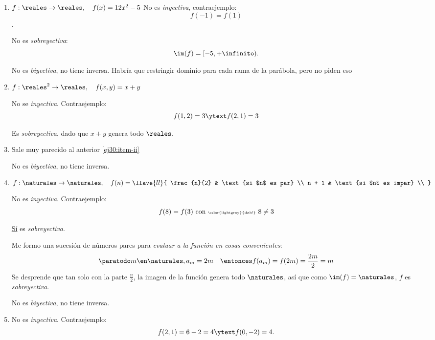 \begin{enumerate}[label=\roman*)]
  \item
        $f: \reales \to \reales,\quad f(x) = 12 x^2 - 5$
        No es \textit{inyectiva}, contraejemplo:
        $$
          f(-1) = f(1)
        $$.

        No es \textit{sobreyectiva}:
        $$
          \im(f) = [-5, +\infinito).
        $$

        No es \textit{biyectiva}, no tiene inversa. Habría que restringir dominio para cada rama de la parábola, pero no piden eso 

  \item\label{ej30:item-ii}
        $f: \reales^2 \to \reales,\quad f(x,y) = x + y$

        No se \textit{inyectiva}. Contraejemplo:
        $$
          f(1,2) = 3 \ytext f(2,1) = 3
        $$

        Es \textit{sobreyectiva}, dado que $x + y$ genera todo $\reales$.

  \item Sale muy parecido al anterior \ref{ej30:item-ii}

        No es \textit{biyectiva}, no tiene inversa.

  \item $f: \naturales \to \naturales,\quad
          f(n) =
          \llave{ll}{
            \frac{n}{2} & \text{si $n$ es par}   \\
            n + 1       & \text{si $n$ es impar} \\
          }$\par

        No es \textit{inyectiva}. Contraejemplo:
        $$
          f(8) = f(3) \text{ con {\tiny \color{lightgray}{dah!}} } 8 \neq 3
        $$

        \underline{Sí} es \textit{sobreyectiva}.

        Me formo una sucesión de números pares para \textit{evaluar a la función
          en cosas convenientes}:
        $$
          \paratodo m \en \naturales, a_m = 2m
          \quad\entonces
          f(a_m) = f(2m) = \frac{2m}{2} = m
        $$
        Se desprende que tan solo con la parte $\frac{n}{2}$, la imagen de la función genera todo $\naturales$,
        así que como $\im(f) = \naturales$, $f$ es \textit{sobreyectiva}.

        No es \textit{biyectiva}, no tiene inversa.

  \item No es \textit{inyectiva}. Contraejemplo:
        $$
          f(2,1) = 6 - 2 = 4 \ytext f(0,-2) = 4.
        $$


\end{enumerate}

